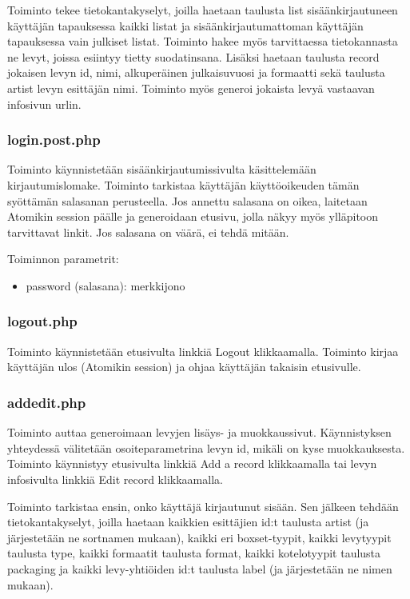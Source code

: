 \documentclass[a4paper,12pt]{report}
\begin{document}
Toiminto tekee tietokantakyselyt, joilla haetaan taulusta list
sisäänkirjautuneen käyttäjän tapauksessa kaikki listat ja
sisäänkirjautumattoman käyttäjän tapauksessa vain julkiset listat.  Toiminto
hakee myös tarvittaessa tietokannasta ne levyt, joissa esiintyy tietty
suodatinsana.  Lisäksi haetaan taulusta record jokaisen levyn id, nimi,
alkuperäinen julkaisuvuosi ja formaatti sekä taulusta artist levyn esittäjän
nimi. Toiminto myös generoi jokaista levyä vastaavan infosivun urlin.

\subsubsection{login.post.php}

Toiminto käynnistetään sisäänkirjautumissivulta käsittelemään
kirjautumislomake. Toiminto tarkistaa käyttäjän käyttöoikeuden tämän
syöttämän salasanan perusteella.  Jos annettu salasana on oikea, laitetaan
Atomikin session päälle ja generoidaan etusivu, jolla näkyy myös ylläpitoon
tarvittavat linkit. Jos salasana on väärä, ei tehdä mitään.

Toiminnon parametrit:
\begin{itemize}
  \item password (salasana): merkkijono
\end{itemize}

\subsubsection{logout.php}

Toiminto käynnistetään etusivulta linkkiä Logout klikkaamalla. Toiminto
kirjaa käyttäjän ulos (Atomikin session) ja ohjaa käyttäjän takaisin
etusivulle.

\subsubsection{addedit.php}

Toiminto auttaa generoimaan levyjen lisäys- ja muokkaussivut. Käynnistyksen
yhteydessä välitetään osoiteparametrina levyn id, mikäli on kyse muokkauksesta.
Toiminto käynnistyy etusivulta linkkiä Add a record klikkaamalla tai levyn
infosivulta linkkiä Edit record klikkaamalla.

Toiminto tarkistaa ensin, onko käyttäjä kirjautunut sisään.  Sen jälkeen
tehdään tietokantakyselyt, joilla haetaan kaikkien esittäjien id:t taulusta
artist (ja järjestetään ne sortnamen mukaan), kaikki eri boxset-tyypit,
kaikki levytyypit taulusta type, kaikki formaatit taulusta format, kaikki
kotelotyypit taulusta packaging ja kaikki levy-yhtiöiden id:t taulusta label
(ja järjestetään ne nimen mukaan).
\end{document}
